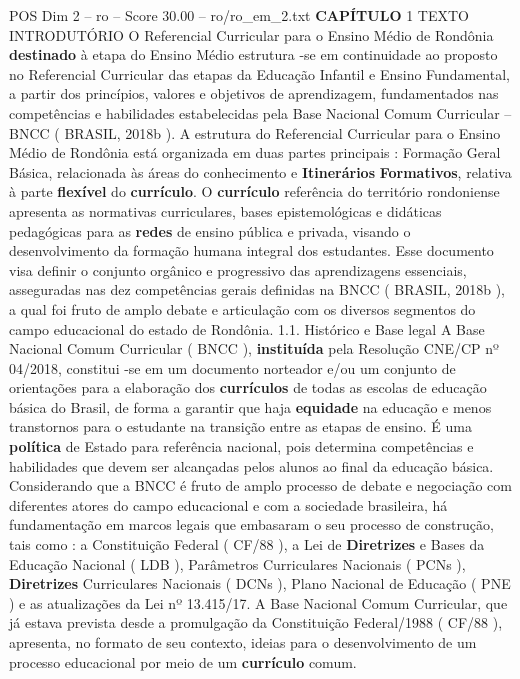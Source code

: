 \begin{textsample}{POS Dim 2 – ro – Score 30.00 – ro/ro\_em\_2.txt}  \label{ex:f2_pos_184}
\textbf{CAPÍTULO} 1 TEXTO INTRODUTÓRIO O Referencial Curricular para o Ensino Médio de Rondônia \textbf{destinado} à etapa do Ensino Médio estrutura -se em continuidade ao proposto no Referencial Curricular das etapas da Educação Infantil e Ensino Fundamental, a partir dos princípios, valores e objetivos de aprendizagem, fundamentados nas competências e habilidades estabelecidas pela Base Nacional Comum Curricular – BNCC ( BRASIL, 2018b ).
A estrutura do Referencial Curricular para o Ensino Médio de Rondônia está organizada em duas partes principais : Formação Geral Básica, relacionada às áreas do conhecimento e \textbf{Itinerários} \textbf{Formativos}, relativa à parte \textbf{flexível} do \textbf{currículo}.
O \textbf{currículo} referência do território rondoniense apresenta as normativas curriculares, bases epistemológicas e didáticas pedagógicas para as \textbf{redes} de ensino pública e privada, visando o desenvolvimento da formação humana integral dos estudantes.
Esse documento visa definir o conjunto orgânico e progressivo das aprendizagens essenciais, asseguradas nas dez competências gerais definidas na BNCC ( BRASIL, 2018b ), a qual foi fruto de amplo debate e articulação com os diversos segmentos do campo educacional do estado de Rondônia. 1.1.
Histórico e Base legal A Base Nacional Comum Curricular ( BNCC ), \textbf{instituída} pela Resolução CNE/CP nº 04/2018, constitui -se em um documento norteador e/ou um conjunto de orientações para a elaboração dos \textbf{currículos} de todas as escolas de educação básica do Brasil, de forma a garantir que haja \textbf{equidade} na educação e menos transtornos para o estudante na transição entre as etapas de ensino.
É uma \textbf{política} de Estado para referência nacional, pois determina competências e habilidades que devem ser alcançadas pelos alunos ao final da educação básica.
Considerando que a BNCC é fruto de amplo processo de debate e negociação com diferentes atores do campo educacional e com a sociedade brasileira, há fundamentação em marcos legais que embasaram o seu processo de construção, tais como : a Constituição Federal ( CF/88 ), a Lei de \textbf{Diretrizes} e Bases da Educação Nacional ( LDB ), Parâmetros Curriculares Nacionais ( PCNs ), \textbf{Diretrizes} Curriculares Nacionais ( DCNs ), Plano Nacional de Educação ( PNE ) e as atualizações da Lei nº 13.415/17.
A Base Nacional Comum Curricular, que já estava prevista desde a promulgação da Constituição Federal/1988 ( CF/88 ), apresenta, no formato de seu contexto, ideias para o desenvolvimento de um processo educacional por meio de um \textbf{currículo} comum.

\end{textsample}

